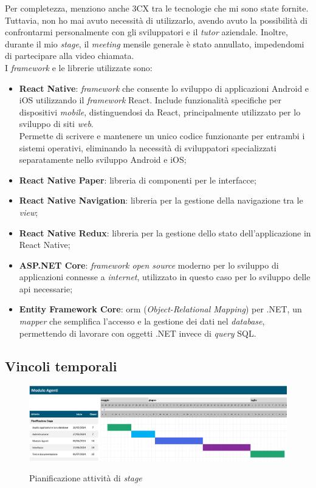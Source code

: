 Per completezza, menziono anche 3CX tra le tecnologie che mi sono state fornite. Tuttavia, non ho mai avuto necessità di utilizzarlo,
avendo avuto la possibilità di confrontarmi personalmente con gli sviluppatori e il \textit{tutor} aziendale. Inoltre, durante
il mio \textit{stage}, il \textit{meeting} mensile generale è stato annullato, impedendomi di partecipare alla video chiamata.\\
I \textit{framework} e le librerie utilizzate sono:
\begin{itemize}
      \item \textbf{React Native}: \textit{framework} che consente lo sviluppo di applicazioni Android e iOS utilizzando il
            \textit{framework} React. Include funzionalità specifiche per dispositivi \textit{mobile}, distinguendosi da
            React, principalmente utilizzato per lo sviluppo di siti \textit{web}.\\
            Permette di scrivere e mantenere un unico codice funzionante per entrambi i sistemi operativi, eliminando la necessità 
            di sviluppatori specializzati separatamente nello sviluppo Android e iOS;
      \item \textbf{React Native Paper}: libreria di componenti per le interfacce;
      \item \textbf{React Native Navigation}: libreria per la gestione della navigazione tra le \textit{view};
      \item \textbf{React Native Redux}: libreria per la gestione dello stato dell'applicazione in React Native;
      \item \textbf{ASP.NET Core}: \textit{framework open source} moderno per lo sviluppo di applicazioni connesse a \textit{internet},
            utilizzato in questo caso per lo sviluppo delle \gls{api} necessarie;
      \item \textbf{Entity Framework Core}: \gls{orm} (\textit{Object-Relational Mapping}) per .NET, un \textit{mapper} che 
            semplifica l'accesso e la gestione dei dati nel \textit{database}, permettendo di lavorare con oggetti .NET 
            invece di \textit{query} SQL.
\end{itemize}

\subsection{Vincoli temporali}\label{chap:vincoli temporali}
\begin{figure}[H]
    \centering
    \includegraphics[alt={Pianificazione attività di stage}, width=\textwidth]{img/gantt pianificazione.png}
    \caption[Pianificazione attività di \textit{stage}]
            {Pianificazione attività di \textit{stage}}
    \label{fig:pianificazione stage}
\end{figure}

